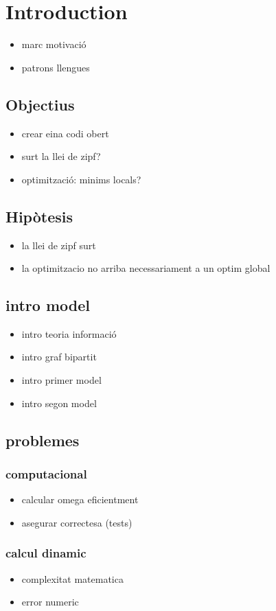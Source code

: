 \chapter{Introduction}
\begin{itemize}
\item marc motivació
\item patrons llengues
\end{itemize}
\section{Objectius}
\begin{itemize}
\item crear eina codi obert
\item surt la llei de zipf?
\item optimització: minims locals?
\end{itemize}
\section{Hipòtesis}
\begin{itemize}
\item la llei de zipf surt
\item la optimitzacio no arriba necessariament a un optim global
\end{itemize}
\section{intro model}
\begin{itemize}
\item intro teoria informació
\item intro graf bipartit
\item intro primer model
\item intro segon model
\end{itemize}
\section{problemes}
\subsection{computacional}
\begin{itemize}
\item calcular omega eficientment
\item asegurar correctesa (tests)
\end{itemize}
\subsection{calcul dinamic}
\begin{itemize}
\item complexitat matematica
\item error numeric
\end{itemize}

